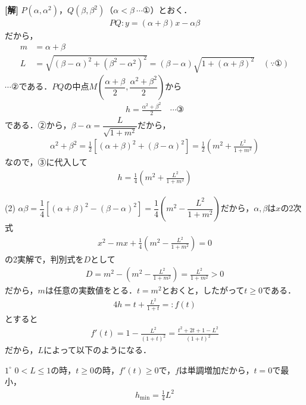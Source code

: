 \documentclass[../main.tex]{subfiles}
\begin{document}
\noindent
{\bf [解]} $P(\alpha,\alpha^2)$，$Q(\beta,\beta^2)$（$\alpha<\beta\ \cdots①$）とおく．
\begin{align*}
  PQ:y=(\alpha+\beta)x-\alpha\beta
\end{align*}
だから，
\begin{align*}
  m&=\alpha+\beta\\
  L&=\sqrt{(\beta-\alpha)^2+(\beta^2-\alpha^2)^2}=(\beta-\alpha)\sqrt{1+(\alpha+\beta)^2}\quad(\because①)
\end{align*}
$\cdots②$である．$PQ$の中点$M\left(\dfrac{\alpha+\beta}2,\dfrac{\alpha^2+\beta^2}2\right)$から
\begin{align*}
  h=\frac{\alpha^2+\beta^2}2\quad\cdots③
\end{align*}
である．②から，$\beta-\alpha=\dfrac L{\sqrt{1+m^2}}$だから，
\begin{align*}
  \alpha^2+\beta^2=\frac12\left[(\alpha+\beta)^2+(\beta-\alpha)^2\right]=\frac12\left(m^2+\frac{L^2}{1+m^2}\right)
\end{align*}
なので，③に代入して
\begin{align*}
  h=\frac14\left(m^2+\frac{L^2}{1+m^2}\right)
\end{align*}

(2) $\alpha\beta=\dfrac14\left[(\alpha+\beta)^2-(\beta-\alpha)^2\right]=\dfrac14\left(m^2-\dfrac{L^2}{1+m^2}\right)$だから，$\alpha,\beta$は$x$の2次式
\begin{align*}
  x^2-mx+\frac14\left(m^2-\frac{L^2}{1+m^2}\right)=0
\end{align*}
の2実解で，判別式を$D$として
\begin{align*}
  D=m^2-\left(m^2-\frac{L^2}{1+m^2}\right)=\frac{L^2}{1+m^2}>0
\end{align*}
だから，$m$は任意の実数値をとる．$t=m^2$とおくと，したがって$t\ge0$である．
\begin{align*}
  4h=t+\frac{L^2}{1+t}=:f(t)
\end{align*}
とすると
\begin{align*}
  f'(t)=1-\frac{L^2}{(1+t)^2}=\frac{t^2+2t+1-L^2}{(1+t)^2}
\end{align*}
だから，$L$によって以下のようになる．

$1^\circ$ $0<L\le1$の時，$t\ge0$の時，$f'(t)\ge0$で，$f$は単調増加だから，$t=0$で最小，
\begin{align*}
  h_{\min}=\frac14L^2
\end{align*}
\end{document}
